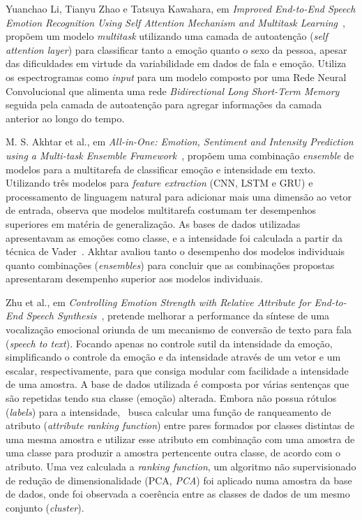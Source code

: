 Yuanchao Li, Tianyu Zhao e Tatsuya Kawahara, em \textit{Improved End-to-End Speech Emotion Recognition Using Self Attention Mechanism and Multitask Learning}~\cite{32.95}, propõem um modelo \textit{multitask} utilizando uma camada de autoatenção (\textit{self attention layer}) para classificar tanto a emoção quanto o sexo da pessoa, apesar das dificuldades em virtude da variabilidade em dados de fala e emoção. Utiliza os espectrogramas como \textit{input} para um modelo composto por uma Rede Neural Convolucional que alimenta uma rede \textit{Bidirectional Long Short-Term Memory} seguida pela camada de autoatenção para agregar informações da camada anterior ao longo do tempo.%

M. S. Akhtar et al., em \textit{All-in-One: Emotion, Sentiment and Intensity Prediction using a Multi-task Ensemble Framework}~\cite{28}, propõem uma combinação \textit{ensemble} de modelos para a multitarefa de classificar emoção e intensidade em texto. Utilizando três modelos para \textit{feature extraction} (\acrshort{CNN}, \acrlong{LSTM} e \acrlong{GRU}) e processamento de linguagem natural para adicionar mais uma dimensão ao vetor de entrada, observa que modelos multitarefa costumam ter desempenhos superiores em matéria de generalização. As bases de dados utilizadas apresentavam as emoções como classe, e a intensidade foi calculada a partir da técnica de Vader~\cite{vader}. Akhtar avaliou tanto o desempenho dos modelos individuais quanto combinações (\textit{ensembles}) para concluir que as combinações propostas apresentaram desempenho superior aos modelos individuais.


Zhu et al., em \textit{Controlling Emotion Strength with Relative Attribute for End-to-End Speech Synthesis}~\cite{63}, pretende melhorar a performance da síntese de uma vocalização emocional oriunda de um mecanismo de conversão de texto para fala (\textit{speech to text}). Focando apenas no controle sutil da intensidade da emoção, simplificando o controle da emoção e da intensidade através de um vetor e um escalar, respectivamente, para que consiga modular com facilidade a intensidade de uma amostra. A base de dados utilizada é composta por várias sentenças que são repetidas tendo sua classe (emoção) alterada. Embora não possua rótulos (\textit{labels}) para a intensidade,~\cite{63} busca calcular uma função de ranqueamento de atributo (\textit{attribute ranking function}) entre pares formados por classes distintas de uma mesma amostra e utilizar esse atributo em combinação com uma amostra de uma classe para produzir a amostra pertencente outra classe, de acordo com o atributo. Uma vez calculada a \textit{ranking function}, um algoritmo não supervisionado de redução de dimensionalidade (\acrlong{PCA}, \textit{PCA}) foi aplicado numa amostra da base de dados, onde foi observada a coerência entre as classes de dados de um mesmo conjunto (\textit{cluster}).

